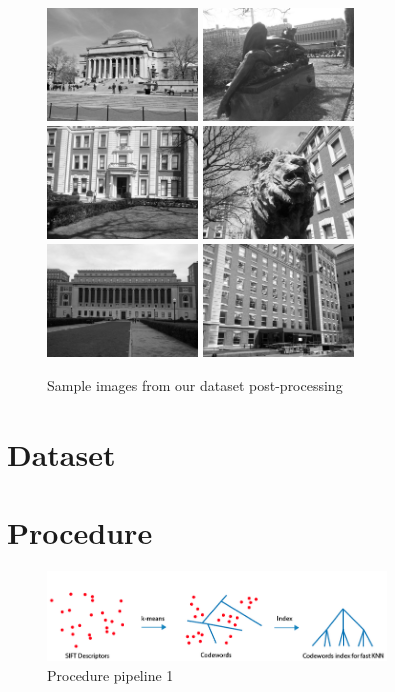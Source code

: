 \documentclass[twocolumn]{article}
\newcommand{\sectionfile}[3]{\section{#1} \label{sec:#2} }
\begin{document}
\begin{figure}
\includegraphics[width=40mm]{sample_data1.jpg}
\includegraphics[width=40mm]{sample_data2.jpg}
\includegraphics[width=40mm]{sample_data3.jpg}
\includegraphics[width=40mm]{sample_data4.jpg}
\includegraphics[width=40mm]{sample_data5.jpg}
\includegraphics[width=40mm]{sample_data6.jpg}
\caption{Sample images from our dataset post-processing}
\label{overflow}
\end{figure}
\sectionfile{Dataset}{dataset}{dataset.tex}
\sectionfile{Procedure}{procedure}{procedure.tex}
\begin{figure}
\includegraphics[width=90mm]{procedure1.png}
\caption{Procedure pipeline 1}
\end{figure}
\end{document}
